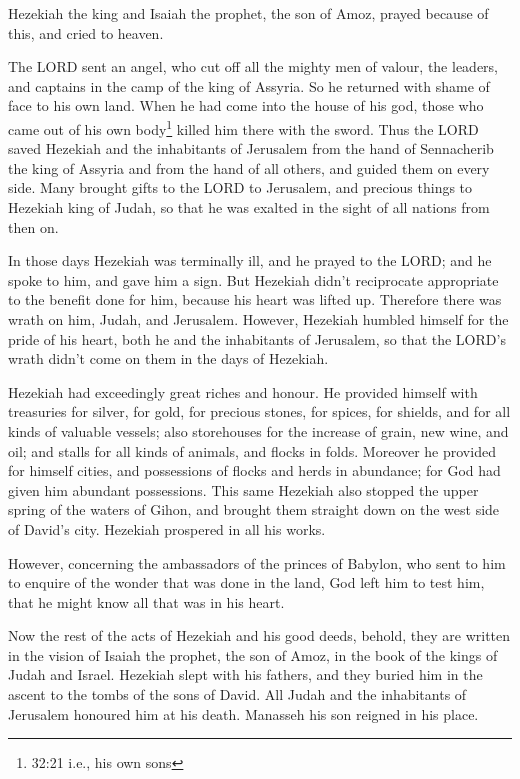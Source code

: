  Hezekiah the king and Isaiah the prophet, the son of Amoz,
prayed because of this, and cried to heaven.

 The LORD sent an angel, who cut off all the mighty men of
valour, the leaders, and captains in the camp of the king of Assyria. So
he returned with shame of face to his own land. When he had come into
the house of his god, those who came out of his own body\footnote{32:21
  i.e., his own sons} killed him there with the sword. 
Thus the LORD saved Hezekiah and the inhabitants of Jerusalem from the
hand of Sennacherib the king of Assyria and from the hand of all others,
and guided them on every side.  Many brought gifts to the
LORD to Jerusalem, and precious things to Hezekiah king of Judah, so
that he was exalted in the sight of all nations from then on.

 In those days Hezekiah was terminally ill, and he prayed
to the LORD; and he spoke to him, and gave him a sign.  But
Hezekiah didn't reciprocate appropriate to the benefit done for him,
because his heart was lifted up. Therefore there was wrath on him,
Judah, and Jerusalem.  However, Hezekiah humbled himself
for the pride of his heart, both he and the inhabitants of Jerusalem, so
that the LORD's wrath didn't come on them in the days of Hezekiah.

 Hezekiah had exceedingly great riches and honour. He
provided himself with treasuries for silver, for gold, for precious
stones, for spices, for shields, and for all kinds of valuable vessels;
 also storehouses for the increase of grain, new wine, and
oil; and stalls for all kinds of animals, and flocks in folds.
 Moreover he provided for himself cities, and possessions
of flocks and herds in abundance; for God had given him abundant
possessions.  This same Hezekiah also stopped the upper
spring of the waters of Gihon, and brought them straight down on the
west side of David's city. Hezekiah prospered in all his works.

 However, concerning the ambassadors of the princes of
Babylon, who sent to him to enquire of the wonder that was done in the
land, God left him to test him, that he might know all that was in his
heart.

 Now the rest of the acts of Hezekiah and his good deeds,
behold, they are written in the vision of Isaiah the prophet, the son of
Amoz, in the book of the kings of Judah and Israel. 
Hezekiah slept with his fathers, and they buried him in the ascent to
the tombs of the sons of David. All Judah and the inhabitants of
Jerusalem honoured him at his death. Manasseh his son reigned in his
place.

